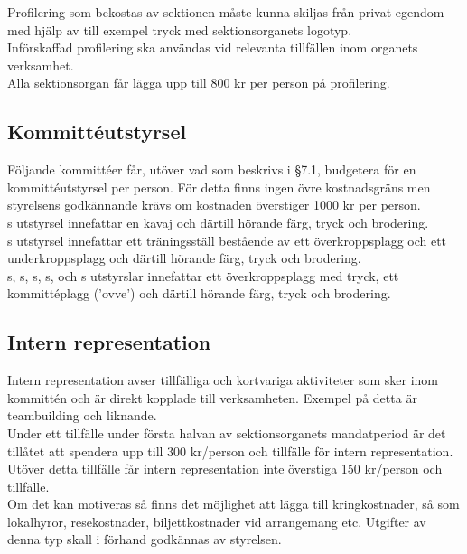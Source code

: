 \documentclass[11pt, includeaddress]{classes/cthit}
\begin{document}
Profilering som bekostas av sektionen måste kunna skiljas från privat egendom med hjälp av till exempel tryck med sektionsorganets logotyp. \\

Införskaffad profilering ska användas vid relevanta tillfällen inom organets verksamhet. \\

Alla sektionsorgan får lägga upp till 800 kr per person på profilering.

\subsection{Kommittéutstyrsel}
Följande kommittéer får, utöver vad som beskrivs i §7.1, budgetera för en kommittéutstyrsel per person. 
För detta finns ingen övre kostnadsgräns men styrelsens godkännande krävs om kostnaden överstiger 1000 kr per person. \\

\ARMIT{}s utstyrsel innefattar en kavaj och därtill hörande färg, tryck och brodering. \\

\FRITID{}s utstyrsel innefattar ett träningsställ bestående av ett överkroppsplagg och ett underkroppsplagg och därtill hörande färg, tryck och brodering. \\

\FLASHIT{}s, \NOLLKIT{}s, \PRIT{}s, \SEXIT{}s, \CLOUDLORDS{} och \MRCIT{}s utstyrslar innefattar ett överkroppsplagg med tryck, ett kommittéplagg (’ovve’) och därtill hörande färg, tryck och brodering.

\subsection{Intern representation}
Intern representation avser tillfälliga och kortvariga aktiviteter som sker inom kommittén och är direkt kopplade till verksamheten. Exempel på detta är teambuilding och liknande. \\

Under ett tillfälle under första halvan av sektionsorganets mandatperiod är det tillåtet att spendera upp till 300 kr/person och tillfälle för intern representation. Utöver detta tillfälle får intern representation inte överstiga 150 kr/person och tillfälle. \\

Om det kan motiveras så finns det möjlighet att lägga till kringkostnader, så som lokalhyror, resekostnader, biljettkostnader vid arrangemang etc. Utgifter av denna typ skall i förhand godkännas av styrelsen. \\
\end{document}
